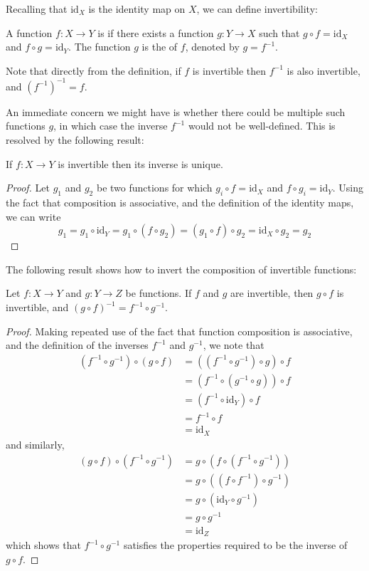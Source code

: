Recalling that $\mathrm{id}_X$ is the identity map on $X$, we can define invertibility:

\begin{definition}
A function $f:X\to Y$ is  if there exists a function $g:Y\to X$ such that $g \circ f = \mathrm{id}_X$ and $f \circ g = \mathrm{id}_Y$. The function $g$ is the  of $f$, denoted by $g=f^{-1}$.
\end{definition}

Note that directly from the definition, if $f$ is invertible then $f^{-1}$ is also invertible, and $(f^{-1})^{-1} = f$.

An immediate concern we might have is whether there could be multiple such functions $g$, in which case the inverse $f^{-1}$ would not be well-defined. This is resolved by the following result:

\begin{proposition}
If $f:X \to Y$ is invertible then its inverse is unique.
\end{proposition}
\begin{proof}
Let $g_1$ and $g_2$ be two functions for which $g_i \circ f = \mathrm{id}_X$ and $f \circ g_i = \mathrm{id}_Y$. Using the fact that composition is associative, and the definition of the identity maps, we can write
\[ g_1 = g_1 \circ \mathrm{id}_Y = g_1 \circ (f \circ g_2) = (g_1 \circ f) \circ g_2 = \mathrm{id}_X \circ g_2 = g_2 \]
\end{proof}

The following result shows how to invert the composition of invertible functions:

\begin{proposition}
Let $f:X \to Y$ and $g:Y \to Z$ be functions. If $f$ and $g$ are invertible, then $g \circ f$ is invertible, and $(g \circ f)^{-1} = f^{-1} \circ g^{-1}$.
\end{proposition}
\begin{proof}
Making repeated use of the fact that function composition is associative, and the definition of the inverses $f^{-1}$ and $g^{-1}$, we note that
\begin{align*}
(f^{-1}\circ g^{-1}) \circ (g \circ f) 
&= ((f^{-1} \circ g^{-1}) \circ g) \circ f \\
&= (f^{-1} \circ (g^{-1} \circ g)) \circ f \\
&= (f^{-1} \circ \mathrm{id}_Y) \circ f \\
&= f^{-1} \circ f \\
&= \mathrm{id}_X
\end{align*}
and similarly,
\begin{align*}
(g \circ f) \circ (f^{-1} \circ g^{-1}) 
&= g \circ (f \circ (f^{-1} \circ g^{-1})) \\
&= g \circ ((f \circ f^{-1}) \circ g^{-1}) \\
&= g \circ (\mathrm{id}_Y \circ g^{-1}) \\
&= g \circ g^{-1} \\
&= \mathrm{id}_Z
\end{align*}
which shows that $f^{-1} \circ g^{-1}$ satisfies the properties required to be the inverse of $g \circ f$.
\end{proof}

